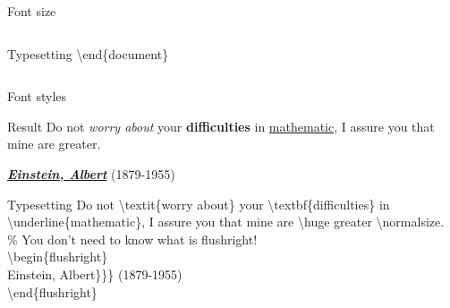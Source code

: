 \documentclass[10pt,xcolor={dvipsnames}]{beamer}
\begin{document}
\begin{frame}{Font size}
\begin{columns}[T]
\begin{column}{.5 \textwidth}
\begin{block}{Typesetting}
						\textbackslash end\{{\color{blue}document}\}
					\end{block}
				\end{column}
			
			\end{columns}

		\end{frame}
		
		\begin{frame}{Font styles}
			\onslide<2->
			\begin{block}{Result}
				Do not \textit{worry about} your \textbf{difficulties} in \underline{mathematic},
				I assure you that mine are \huge greater. \normalsize

				\begin{flushright}
					\underline{\textbf{\textit{Einstein, Albert}}} (1879-1955)
				\end{flushright}
			\end{block}
			
			\begin{block}{Typesetting}
				Do not {\color{orange}\textbackslash textit\{}worry about{\color{orange}\}} your {\color{orange}\textbackslash textbf\{}difficulties{\color{orange}\}} 
				in {\color{orange}\textbackslash underline\{}mathematic{\color{orange}\}},
				I assure you that mine are \textbackslash huge greater \textbackslash normalsize.\\
				
				\% You don't need to know what is flushright!\\  
				\textbackslash begin\{flushright\}\\
				Einstein, Albert{\color{orange}\}\}\}} (1879-1955)\\
				\textbackslash end\{flushright\}\\
				
			\end{block}
		\end{frame}
	
\end{document}
